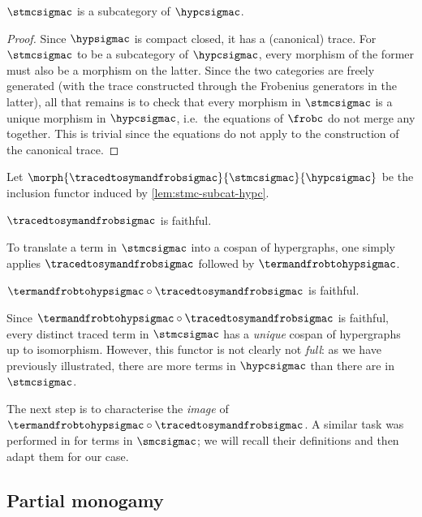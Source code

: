 \begin{lemma}
    \label{lem:stmc-subcat-hypc}
    \(\stmcsigmac\) is a subcategory of \(\hypcsigmac\).
\end{lemma}
\begin{proof}
    Since \(\hypsigmac\) is compact closed, it has a (canonical) trace.
    For \(\stmcsigmac\) to be a subcategory of \(\hypcsigmac\), every morphism
    of the former must also be a morphism on the latter.
    Since the two categories are freely generated (with the trace constructed
    through the Frobenius generators in the latter), all that remains is to
    check that every morphism in \(\stmcsigmac\) is a unique morphism in
    \(\hypcsigmac\), i.e.\ the equations of \(\frobc\) do not merge any together.
    This is trivial since the equations do not apply to the construction of the
    canonical trace.
\end{proof}

\begin{definition}
    Let \(\morph{\tracedtosymandfrobsigmac}{\stmcsigmac}{\hypcsigmac}\) be the
    inclusion functor induced by \cref{lem:stmc-subcat-hypc}.
\end{definition}

\begin{corollary}
    \(\tracedtosymandfrobsigmac\) is faithful.
\end{corollary}

To translate a term in \(\stmcsigmac\) into a cospan of hypergraphs, one simply
applies \(\tracedtosymandfrobsigmac\) followed by \(\termandfrobtohypsigmac\).

\begin{corollary}
    \(\termandfrobtohypsigmac \circ \tracedtosymandfrobsigmac\) is faithful.
\end{corollary}

Since \(\termandfrobtohypsigmac \circ \tracedtosymandfrobsigmac\) is faithful,
every distinct traced term in \(\stmcsigmac\) has a \emph{unique} cospan of
hypergraphs up to isomorphism.
However, this functor is not clearly not \emph{full}: as we have previously
illustrated, there are more terms in \(\hypcsigmac\) than there are in
\(\stmcsigmac\).

The next step is to characterise the \emph{image} of
\(\termandfrobtohypsigmac \circ \tracedtosymandfrobsigmac\).
A similar task was performed in \cite{bonchi2022stringa} for terms in
\(\smcsigmac\); we will recall their definitions and then adapt them for our
case.

\subsection{Partial monogamy}

